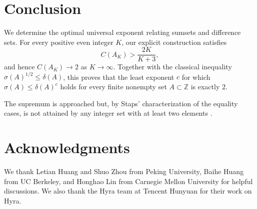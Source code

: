\documentclass[11pt,reqno]{amsart}
\theoremstyle{plain}
\theoremstyle{definition}
\theoremstyle{remark}
\theoremstyle{named}
\begin{document}
\section{Conclusion}\label{sec:conclusion}

We determine the optimal universal exponent relating sumsets and difference
sets. For every positive even integer $K$, our explicit construction satisfies
\[
C(A_K)>\frac{2K}{K+3},
\]
and hence $C(A_K)\to 2$ as $K\to\infty$. Together with the classical inequality $\sigma(A)^{1/2}\leq \delta(A)$, this proves that the least exponent $c$ for which $\sigma(A)\leq \delta(A)^c$ holds for every finite nonempty set $A\subset\mathbb Z$ is exactly $2$.

The supremum is approached but, by Staps' characterization of the equality cases, is not attained by any integer set with at least two elements \cite{Staps2015}. 

\clearpage
\section*{Acknowledgments}

We thank Letian Huang and Shuo Zhou from Peking University, Baihe Huang from UC Berkeley, and Honghao Lin from Carnegie Mellon University for helpful discussions. We also thank the Hyra team at Tencent Hunyuan for their work on Hyra.

\FloatBarrier



\end{document}
